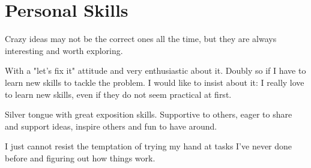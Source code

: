 \documentclass[11pt,a4paper,roman]{moderncv}
\begin{document}

\section{Personal Skills}

{Crazy ideas may not be the correct ones all the time, but they are always interesting and worth exploring.}

{With a "let's fix it" attitude and very enthusiastic about it. Doubly so if I have to learn new skills to tackle the problem. I would like to insist about it: I really love to learn new skills, even if they do not seem practical at first.}

{Silver tongue with great exposition skills. Supportive to others, eager to share and support ideas, inspire others and fun to have around.}

{I just cannot resist the temptation of trying my hand at tasks I've never done before and figuring out how things work.}




\renewcommand{\listitemsymbol}{-~}            %



%


\end{document}
